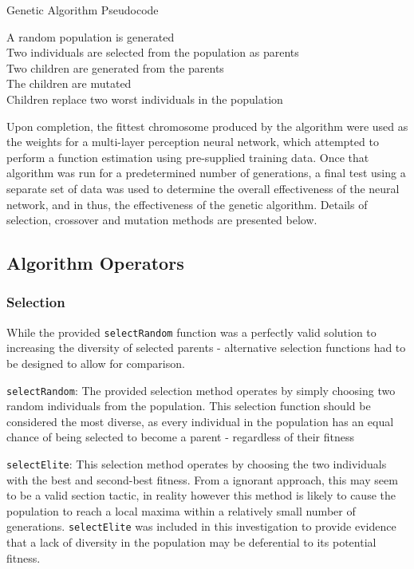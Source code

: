 		\begin{algorithm}[H]
			\caption{Genetic Algorithm Pseudocode}
			A random population is generated\\
			Two individuals are selected from the population as parents\\
			Two children are generated from  the parents\\
			The children are mutated\\
			Children replace two worst individuals in the population
		\end{algorithm}
		
		Upon completion, the fittest chromosome produced by the algorithm were used as the weights for a multi-layer perception neural network, which attempted to perform a function estimation using pre-supplied training data. Once that algorithm was run for a predetermined number of generations, a final test using a separate set of data was used to determine the overall effectiveness of the neural network, and in thus, the effectiveness of the genetic algorithm. Details of selection, crossover and mutation methods are presented below.  
			
	\subsection{Algorithm Operators}
		\subsubsection{Selection}
			While the provided \texttt{selectRandom} function was a perfectly valid solution to increasing the diversity of selected parents - alternative selection functions had to be designed to allow for comparison.
			
			\texttt{selectRandom}: The provided selection method operates by simply choosing two random individuals from the population. This selection function should be considered the most diverse, as every individual in the population has an equal chance of being selected to become a parent - regardless of their fitness
	
			\texttt{selectElite}: This selection method operates by choosing the two individuals with the best and second-best fitness. From a ignorant approach, this may seem to be a valid section tactic, in reality however this method is likely to cause the population to reach a local maxima within a relatively small number of generations. \texttt{selectElite} was included in this investigation to provide evidence that a lack of diversity in the population may be deferential to its potential fitness.
			
